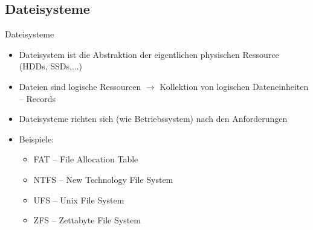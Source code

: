 \documentclass[xcolor=dvipsnames,aspectratio=169]{beamer}
\begin{document}
\subsection{Dateisysteme}
\begin{frame}{Dateisysteme}
	\begin{itemize}
		\item Dateisystem ist die Abstraktion der eigentlichen physischen Ressource (HDDs, SSDs,...)
		\item Dateien sind logische Ressourcen $\rightarrow$ Kollektion von logischen Dateneinheiten -- Records
		\item Dateisysteme richten sich (wie Betriebssystem) nach den Anforderungen
		\item Beispiele:
		\begin{itemize}
			\item FAT -- File Allocation Table
			\item NTFS -- New Technology File System
			\item UFS -- Unix File System
			\item ZFS -- Zettabyte File System
		\end{itemize}
	\end{itemize}
\end{frame}
\end{document}
